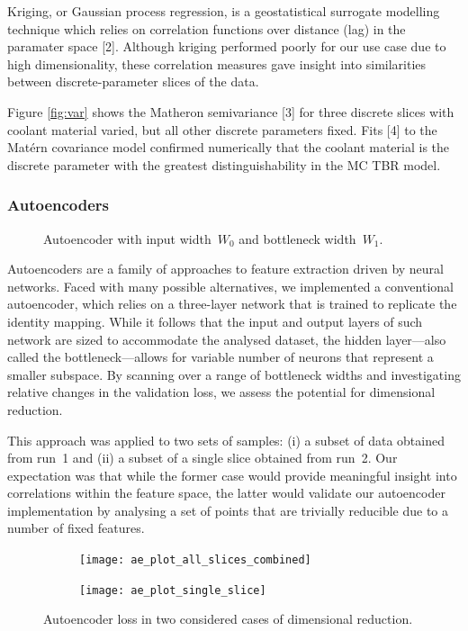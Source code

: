 Kriging, or Gaussian process regression, is a geostatistical surrogate modelling technique which relies on correlation functions over distance (lag) in the paramater space [2]. Although kriging performed poorly for our use case due to high dimensionality, these correlation measures gave insight into similarities between discrete-parameter slices of the data.

Figure \ref{fig:var} shows the Matheron semivariance [3] for three discrete slices with coolant material varied, but all other discrete parameters fixed. Fits [4] to the Matérn covariance model confirmed numerically that the coolant material is the discrete parameter with the greatest distinguishability in the MC TBR model. 


\subsubsection{Autoencoders}

\begin{figure}
	\centering
	\vspace{-3ex}
	{\footnotesize {}}
	\caption{Autoencoder with input width~$W_0$ and bottleneck width~$W_1$.}
	\label{fig:autoencoder}
\end{figure}

Autoencoders are a family of approaches to feature extraction driven by neural
networks. Faced with many possible alternatives, we implemented a conventional
autoencoder, which relies on a three-layer network that is trained to replicate
the identity mapping. While it follows that the input and output layers of such
network are sized to accommodate the analysed dataset, the
hidden layer---also called the bottleneck---allows for variable number of
neurons that represent a smaller subspace. By scanning
over a range of bottleneck widths and investigating relative changes in the
validation loss, we assess the potential for dimensional reduction.

This approach was applied to two sets of samples: (i) a subset of data obtained
from run~1 and (ii) a subset of a single slice obtained from run~2. Our
expectation was that while the former case would provide meaningful insight into
correlations within the feature space, the latter would validate our
autoencoder implementation by analysing a set of points that are trivially
reducible due to a number of fixed features.

\begin{figure}
	\centering
	\vspace{-3ex}
	\begin{subfigure}[b]{\linewidth}
		\centering
		\texttt{[image: ae\_plot\_all\_slices\_combined]}
	\end{subfigure}
	\begin{subfigure}[b]{\linewidth}
		\centering
		\texttt{[image: ae\_plot\_single\_slice]}
	\end{subfigure}
	\caption{Autoencoder loss in two considered cases of dimensional reduction.}
	\label{fig:autoencoder-loss}
\end{figure}

